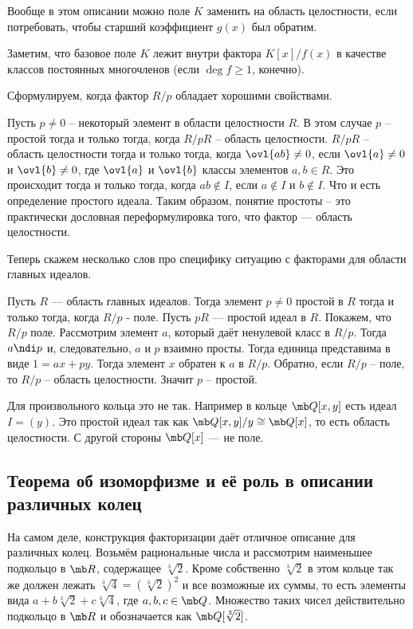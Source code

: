 \rm Вообще в этом описании можно поле $K$ заменить на область целостности, если потребовать, чтобы старший коэффициент $g(x)$ был обратим.
\erm


\rm Заметим, что базовое поле $K$ лежит внутри фактора $K[x]/f(x)$  в качестве классов постоянных многочленов (если $\deg f\geq 1$, конечно).
\erm



Сформулируем, когда фактор $R/p$ обладает хорошими свойствами.



 Пусть $p\neq 0$ -- некоторый элемент в  области целостности $R$. В этом случае $p$ -- простой тогда и только тогда, когда $R/pR$ -- область целостности.
\proof $R/pR$ -- область целостности тогда и только тогда, когда $\ovl{ab}\neq 0$, если $\ovl{a}\neq 0$ и $\ovl{b} \neq 0$, где $\ovl{a}$ и $\ovl{b}$ классы элементов $a,b \in R$. Это происходит тогда и только тогда, когда $ab\notin I$, если $a\notin I$ и $b\notin I$. Что и есть определение простого идеала. Таким образом, понятие простоты -- это практически дословная переформулировка того, что фактор --- область целостности.
\endproof
\elm



Теперь скажем несколько слов про специфику ситуацию с факторами для области главных идеалов.

\lm Пусть $R$ --- область главных идеалов. Тогда элемент $p\neq 0$ простой в $R$ тогда и только тогда, когда $R/p$ - поле.
\proof Пусть $pR$ --- простой идеал в $R$. Покажем, что $R/p$ поле. Рассмотрим элемент $a$, который даёт ненулевой класс в $R/p$. Тогда $a \ndi p$ и, следовательно, $a$ и $p$ взаимно просты. Тогда единица представима в виде $1=ax+py$. Тогда элемент $x$ обратен к $a$ в $R/p$.
Обратно, если $R/p$ -- поле, то $R/p$ -- область целостности. Значит $p$ -- простой.
\endproof
\elm

\rm Для произвольного кольца это не так. Например в кольце $\mb Q[x,y]$ есть идеал $I=(y)$. Это простой идеал так как $\mb Q[x,y]/y\cong \mb Q[x]$, то есть область целостности. С другой стороны $\mb Q[x]$ --- не поле. 
\erm

\subsection{Теорема об изоморфизме и её роль в описании различных колец}

На самом деле, конструкция факторизации даёт отличное описание для различных колец. Возьмём рациональные числа и рассмотрим наименьшее подкольцо в $\mb R$, содержащее $\sqrt[3]{2}$. Кроме собственно $\sqrt[3]{2}$ в этом кольце так же должен лежать $\sqrt[3]{4}=(\sqrt[3]{2})^2$ и все возможные их суммы, то есть элементы вида $a+b\sqrt[3]{2}+c\sqrt[3]{4}$, где $a,b,c \in \mb Q$. Множество таких чисел действительно подкольцо в $\mb R$ и обозначается как $\mb Q[\sqrt[3]{2}]$. 

